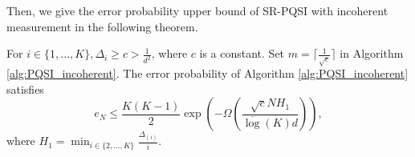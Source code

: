 Then, we give the error probability upper bound of SR-PQSI with incoherent measurement in the following theorem.

\begin{theorem}
    \label{thm:alg_SRPQSI}
    For $ i \in \{1,...,K\}, \Delta_i \geq c > \frac{1}{d^2}$, where $c$ is a constant. Set $m=\lceil \frac{1}{\sqrt{c}} \rceil$ in Algorithm \ref{alg:PQSI_incoherent}. The error probability of Algorithm \ref{alg:PQSI_incoherent} satisfies
    \begin{equation*}
         e_N \leq \frac{K(K-1)}{2}\exp\left(-\Omega \left( \frac{\sqrt{c}N H_1}{\overline{\log}(K) d }\right) \right),
    \end{equation*}
    where $H_1 = \min_{i \in \{2,...,K\}} \frac{\Delta_{(i)}}{i}$.
\end{theorem}

